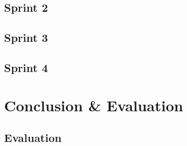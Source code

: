 \documentclass[12pt]{report}
\begin{document}

	

	

	

	

	

	

	

	

\chapter{Sprint 2}

	

	

	

	

	

	

	

	

\chapter{Sprint 3}

\chapter{Sprint 4}

\part{Conclusion \& Evaluation}

\chapter{Evaluation}

	
\end{document}
